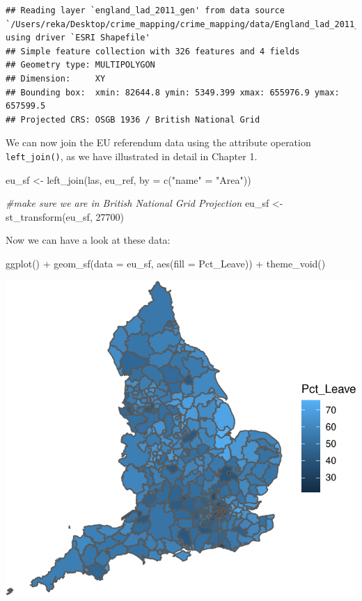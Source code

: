 \documentclass[
]{book}
\makeatletter
\newenvironment{Shaded}{\begin{snugshade}}{\end{snugshade}}
\newcommand{\AttributeTok}[1]{\textcolor[rgb]{0.61,0.61,0.61}{#1}}
\newcommand{\CommentTok}[1]{\textcolor[rgb]{0.37,0.37,0.37}{\textit{#1}}}
\newcommand{\DecValTok}[1]{\textcolor[rgb]{0.06,0.06,0.06}{#1}}
\newcommand{\FunctionTok}[1]{\textcolor[rgb]{0,0,0}{#1}}
\newcommand{\NormalTok}[1]{#1}
\newcommand{\OtherTok}[1]{\textcolor[rgb]{0.37,0.37,0.37}{#1}}
\newcommand{\SpecialCharTok}[1]{\textcolor[rgb]{0,0,0}{#1}}
\newcommand{\StringTok}[1]{\textcolor[rgb]{0.5,0.5,0.5}{#1}}
\newenvironment{kframe}{%
\medskip{}
\setlength{\fboxsep}{.8em}
 \def\at@end@of@kframe{}%
 \ifinner\ifhmode%
  \def\at@end@of@kframe{\end{minipage}}%
  \begin{minipage}{\columnwidth}%
 \fi\fi%
 \def\FrameCommand##1{\hskip\@totalleftmargin \hskip-\fboxsep
 \colorbox{shadecolor}{##1}\hskip-\fboxsep
     \hskip-\linewidth \hskip-\@totalleftmargin \hskip\columnwidth}%
 \MakeFramed {\advance\hsize-\width
   \@totalleftmargin\z@ \linewidth\hsize
   \@setminipage}}%
 {\par\unskip\endMakeFramed%
 \at@end@of@kframe}
\renewenvironment{Shaded}{\begin{kframe}}{\end{kframe}}
\makeatother
\begin{document}
\begin{verbatim}
## Reading layer `england_lad_2011_gen' from data source `/Users/reka/Desktop/crime_mapping/crime_mapping/data/England_lad_2011_gen/england_lad_2011_gen.shp' using driver `ESRI Shapefile'
## Simple feature collection with 326 features and 4 fields
## Geometry type: MULTIPOLYGON
## Dimension:     XY
## Bounding box:  xmin: 82644.8 ymin: 5349.399 xmax: 655976.9 ymax: 657599.5
## Projected CRS: OSGB 1936 / British National Grid
\end{verbatim}

We can now join the EU referendum data using the attribute operation \texttt{left\_join()}, as we have illustrated in detail in Chapter 1.

\begin{Shaded}
\begin{Highlighting}[]
\NormalTok{eu\_sf }\OtherTok{\textless{}{-}} \FunctionTok{left\_join}\NormalTok{(las, eu\_ref, }\AttributeTok{by =} \FunctionTok{c}\NormalTok{(}\StringTok{"name"} \OtherTok{=} \StringTok{"Area"}\NormalTok{))}

\CommentTok{\#make sure we are in British National Grid Projection}
\NormalTok{eu\_sf }\OtherTok{\textless{}{-}} \FunctionTok{st\_transform}\NormalTok{(eu\_sf, }\DecValTok{27700}\NormalTok{)}
\end{Highlighting}
\end{Shaded}

Now we can have a look at these data:

\begin{Shaded}
\begin{Highlighting}[]
\FunctionTok{ggplot}\NormalTok{() }\SpecialCharTok{+}
  \FunctionTok{geom\_sf}\NormalTok{(}\AttributeTok{data =}\NormalTok{ eu\_sf, }\FunctionTok{aes}\NormalTok{(}\AttributeTok{fill =}\NormalTok{ Pct\_Leave)) }\SpecialCharTok{+} 
  \FunctionTok{theme\_void}\NormalTok{()}
\end{Highlighting}
\end{Shaded}

\includegraphics{crime_mapping_files/figure-latex/unnamed-chunk-134-1.pdf}
\end{document}
